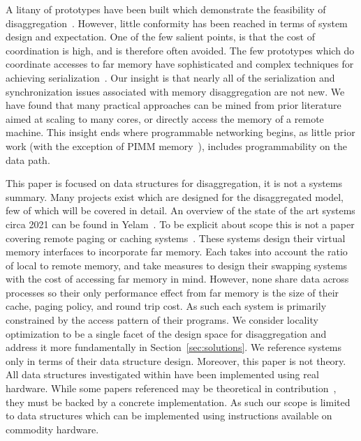 
A litany of prototypes have been built which demonstrate the feasibility of
disaggregation~\cite{infiniswap,fastswap,leap,legoos,aifm,kona,reigons,software-far,lite,semeru}.
However, little conformity has been reached in terms of system design and
expectation. One of the few salient points, is that the cost of coordination is
high, and is therefore often avoided. The few prototypes which do coordinate
accesses to far memory have sophisticated and complex techniques for achieving
serialization~\cite{clover,one-sided-hash,sherman,ford}. Our insight is that nearly all of
the serialization and synchronization issues associated with memory
disaggregation are not new. We have found that many practical approaches can be
mined from prior literature aimed at scaling to many cores, or directly access
the memory of a remote machine. This insight ends where programmable networking
begins, as little prior work (with the exception of PIMM memory~\cite{near-memory-structs}),
includes programmability on the data path.

This paper is focused on data structures for disaggregation, it is not a systems
summary.  Many projects exist which are designed for the disaggregated model,
few of which will be covered in detail. An overview of the state of the art
systems circa 2021 can be found in Yelam~\cite{yelam2022systems}.
To be explicit about scope this is not a paper covering remote paging or caching
systems~\cite{fastswap,kona,infiniswap,leap,legoos}. These systems design their
virtual memory interfaces to incorporate far memory. Each takes into account the
ratio of local to remote memory, and take measures to design their swapping
systems with the cost of accessing far memory in mind.  However, none share data
across processes so their only performance effect from far memory is the size of
their cache, paging policy, and round trip cost. As such each system is
primarily constrained by the access pattern of their programs. We consider
locality optimization to be a single facet of the design space for
disaggregation and address it more fundamentally in
Section~\ref{sec:solutions}. We reference systems only in terms of their data
structure design.
Moreover, this paper is not theory. All data structures investigated within have been
implemented using real hardware. While some papers referenced may be theoretical
in contribution~\cite{flat-combine,hopscotch,linked-list-cas}, they must be
backed by a concrete implementation. As such our scope is limited to data
structures which can be implemented using instructions available on commodity
hardware.

